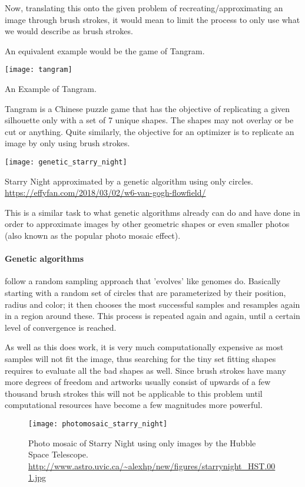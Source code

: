 Now, translating this onto the given problem of recreating/approximating an image
through brush strokes, it would mean to limit the process to only use what we would
describe as brush strokes. 

An equivalent example would be the game of Tangram.

\begin{marginfigure}
    \texttt{[image: tangram]}
    \caption[]{An Example of Tangram.}
\end{marginfigure}

Tangram is a Chinese puzzle game that has the objective of replicating a given silhouette
only with a set of 7 unique shapes.
The shapes may not overlay or be cut or anything.
Quite similarly, the objective for an optimizer is to replicate an image by only
using brush strokes.

\begin{marginfigure}
    \texttt{[image: genetic\_starry\_night]}
    \caption[]{Starry Night approximated by a genetic algorithm using only circles. \url{https://effyfan.com/2018/03/02/w6-van-gogh-flowfield/}}
\end{marginfigure}

This is a similar task to what genetic algorithms already can do and have done in
order to approximate images by other geometric shapes or even smaller photos (also 
known as the popular photo mosaic effect).
\paragraph{Genetic algorithms} follow a random sampling approach that 'evolves' like genomes do.
Basically starting with a random set of circles that are parameterized by their position,
radius and color; it then chooses the most successful samples and resamples again
in a region around these.
This process is repeated again and again, until a certain level of convergence is reached.

As well as this does work, it is very much computationally expensive as most samples
will not fit the image, thus searching for the tiny set fitting shapes requires
to evaluate all the bad shapes as well.
Since brush strokes have many more degrees of freedom and artworks usually consist
of upwards of a few thousand brush strokes this will not be applicable to this problem
until computational resources have become a few magnitudes more powerful.

\begin{figure}
    \texttt{[image: photomosaic\_starry\_night]}
    \caption[]{Photo mosaic of Starry Night using only images by the Hubble Space Telescope. \url{http://www.astro.uvic.ca/~alexhp/new/figures/starrynight_HST.001.jpg}}
\end{figure}

